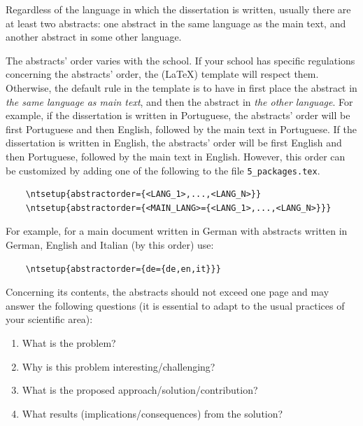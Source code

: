 
%

Regardless of the language in which the dissertation is written, usually there are at least two abstracts: one abstract in the same language as the main text, and another abstract in some other language.

The abstracts' order varies with the school.  If your school has specific regulations concerning the abstracts' order, the (\LaTeX) template will respect them.  Otherwise, the default rule in the  template is to have in first place the abstract in \emph{the same language as main text}, and then the abstract in \emph{the other language}. For example, if the dissertation is written in Portuguese, the abstracts' order will be first Portuguese and then English, followed by the main text in Portuguese. If the dissertation is written in English, the abstracts' order will be first English and then Portuguese, followed by the main text in English.
%
However, this order can be customized by adding one of the following to the file \verb+5_packages.tex+.

\begin{verbatim}
    \ntsetup{abstractorder={<LANG_1>,...,<LANG_N>}}
    \ntsetup{abstractorder={<MAIN_LANG>={<LANG_1>,...,<LANG_N>}}}
\end{verbatim}

For example, for a main document written in German with abstracts written in German, English and Italian (by this order) use:
\begin{verbatim}
    \ntsetup{abstractorder={de={de,en,it}}}
\end{verbatim}

Concerning its contents, the abstracts should not exceed one page and may answer the following questions (it is essential to adapt to the usual practices of your scientific area):

\begin{enumerate}
  \item What is the problem?
  \item Why is this problem interesting/challenging?
  \item What is the proposed approach/solution/contribution?
  \item What results (implications/consequences) from the solution?
\end{enumerate}

